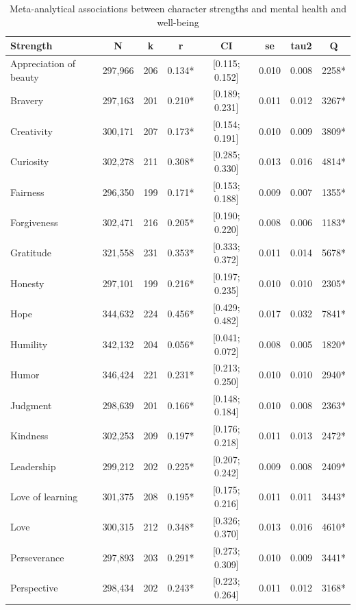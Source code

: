 \documentclass[
  man,floatsintext]{apa6}
\begin{document}
\begin{table}
\centering
\caption{\label{tab:unnamed-chunk-3}Meta-analytical associations between character strengths and mental health and well-being}
\centering
\fontsize{9}{11}\selectfont
\begin{tabular}[t]{lccccccc}
\toprule
Strength & N & k & r & CI & se & tau2 & Q\\
\midrule
Appreciation of beauty & 297,966 & 206 & 0.134* & {}[0.115; 0.152] & 0.010 & 0.008 & 2258*\\
Bravery & 297,163 & 201 & 0.210* & {}[0.189; 0.231] & 0.011 & 0.012 & 3267*\\
Creativity & 300,171 & 207 & 0.173* & {}[0.154; 0.191] & 0.010 & 0.009 & 3809*\\
Curiosity & 302,278 & 211 & 0.308* & {}[0.285; 0.330] & 0.013 & 0.016 & 4814*\\
Fairness & 296,350 & 199 & 0.171* & {}[0.153; 0.188] & 0.009 & 0.007 & 1355*\\
\addlinespace
Forgiveness & 302,471 & 216 & 0.205* & {}[0.190; 0.220] & 0.008 & 0.006 & 1183*\\
Gratitude & 321,558 & 231 & 0.353* & {}[0.333; 0.372] & 0.011 & 0.014 & 5678*\\
Honesty & 297,101 & 199 & 0.216* & {}[0.197; 0.235] & 0.010 & 0.010 & 2305*\\
Hope & 344,632 & 224 & 0.456* & {}[0.429; 0.482] & 0.017 & 0.032 & 7841*\\
Humility & 342,132 & 204 & 0.056* & {}[0.041; 0.072] & 0.008 & 0.005 & 1820*\\
\addlinespace
Humor & 346,424 & 221 & 0.231* & {}[0.213; 0.250] & 0.010 & 0.010 & 2940*\\
Judgment & 298,639 & 201 & 0.166* & {}[0.148; 0.184] & 0.010 & 0.008 & 2363*\\
Kindness & 302,253 & 209 & 0.197* & {}[0.176; 0.218] & 0.011 & 0.013 & 2472*\\
Leadership & 299,212 & 202 & 0.225* & {}[0.207; 0.242] & 0.009 & 0.008 & 2409*\\
Love of learning & 301,375 & 208 & 0.195* & {}[0.175; 0.216] & 0.011 & 0.011 & 3443*\\
\addlinespace
Love & 300,315 & 212 & 0.348* & {}[0.326; 0.370] & 0.013 & 0.016 & 4610*\\
Perseverance & 297,893 & 203 & 0.291* & {}[0.273; 0.309] & 0.010 & 0.009 & 3441*\\
Perspective & 298,434 & 202 & 0.243* & {}[0.223; 0.264] & 0.011 & 0.012 & 3168*\\

\end{tabular}
\end{table}
\end{document}
